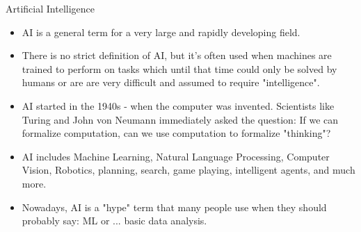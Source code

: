 \documentclass[11pt,compress,t,notes=noshow, xcolor=table]{beamer}
\begin{document}
\begin{frame}{Artificial Intelligence}

\begin{itemize}
	\item AI is a general term for a very large and rapidly developing field.
	\item There is no strict definition of AI, but it's often used when machines are trained to perform on tasks which until that time could only be solved by humans or are are very difficult and assumed to require "intelligence".
    \item AI started in the 1940s - when the computer was invented. Scientists like 
        Turing and John von Neumann immediately asked the question:
        If we can formalize computation, can we use computation to formalize "thinking"?
	\item AI includes Machine Learning, Natural Language Processing, Computer Vision, Robotics, planning, search, game playing, intelligent agents, and much more.
    \item Nowadays, AI is a "hype" term that many people use when they should probably say: ML or ... basic data analysis.
\end{itemize}
  
\end{frame}

\end{document}
